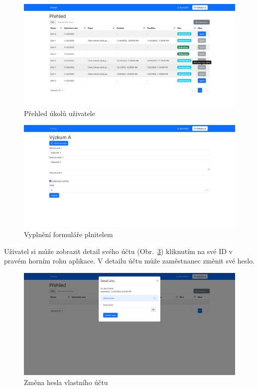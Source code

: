 \begin{figure}[H]
    \includegraphics[width=\textwidth]{../img/screenshots/prehled-uzivatel}
    \caption{Přehled úkolů uživatele}\label{fig:prehled-ukolu-uzivatel-screenshot}
\end{figure}

\begin{figure}[H]
    \includegraphics[width=\textwidth]{../img/screenshots/vyplneni-formulare-uzivatel}
    \caption{Vyplnění formuláře plnitelem}\label{fig:vyplneni-formulare-uzivatel-screenshot}
\end{figure}

Uživatel si může zobrazit detail svého účtu (Obr.~\ref{fig:zmena-hesla-uzivatel}) kliknutím na své ID v pravém horním rohu aplikace.
V detailu účtu může zaměstnanec změnit své heslo.

\begin{figure}[H]
    \includegraphics[width=\textwidth]{../img/screenshots/zmena-hesla-uzivatel}
    \caption{Změna hesla vlastního účtu}\label{fig:zmena-hesla-uzivatel}
\end{figure}
